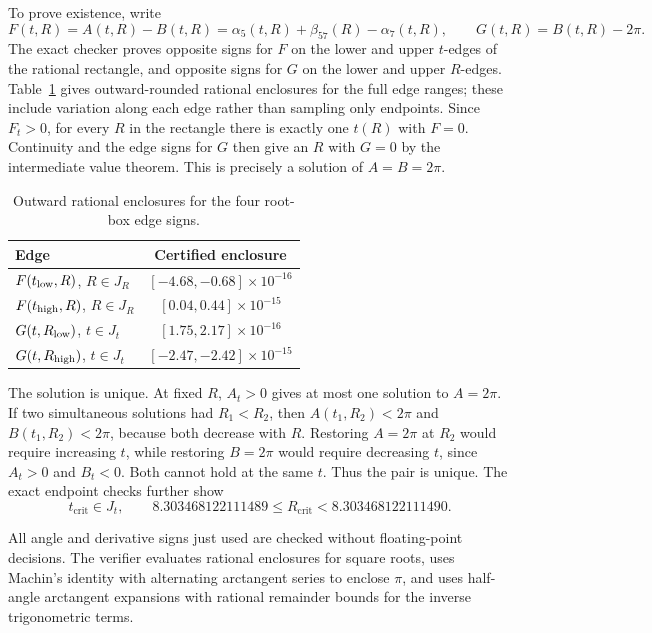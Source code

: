 \documentclass[11pt,a4paper]{article}
\theoremstyle{remark}
\newcommand{\Rcrit}{R_{\mathrm{crit}}}
\begin{document}
To prove existence, write
\[
 F(t,R)=A(t,R)-B(t,R)
       =\alpha_5(t,R)+\beta_{57}(R)-\alpha_7(t,R),
 \qquad
 G(t,R)=B(t,R)-2\pi.
\]
The exact checker proves opposite signs for $F$ on the lower and upper
$t$-edges of the rational rectangle, and opposite signs for $G$ on the lower
and upper $R$-edges.  Table~\ref{tab:root-edge-signs} gives outward-rounded
rational enclosures for the full edge ranges; these include variation along
each edge rather than sampling only endpoints.  Since $F_t>0$,
for every $R$ in the rectangle there is exactly one $t(R)$ with $F=0$.
Continuity and the edge signs for $G$ then give an $R$ with $G=0$ by the
intermediate value theorem.  This is precisely a solution of
$A=B=2\pi$.

\begin{table}[ht]
\centering
\small
\caption{Outward rational enclosures for the four root-box edge signs.}
\label{tab:root-edge-signs}
\begin{tabular}{lc}
\toprule
Edge & Certified enclosure\\
\midrule
$F(t_{\rm low},R)$, $R\in J_R$ & $[-4.68,-0.68]\times10^{-16}$\\
$F(t_{\rm high},R)$, $R\in J_R$ & $[0.04,0.44]\times10^{-15}$\\
$G(t,R_{\rm low})$, $t\in J_t$ & $[1.75,2.17]\times10^{-16}$\\
$G(t,R_{\rm high})$, $t\in J_t$ & $[-2.47,-2.42]\times10^{-15}$\\
\bottomrule
\end{tabular}
\end{table}

The solution is unique.  At fixed $R$, $A_t>0$ gives at most one solution
to $A=2\pi$.  If two simultaneous solutions had $R_1<R_2$, then
$A(t_1,R_2)<2\pi$ and $B(t_1,R_2)<2\pi$, because both decrease with $R$.
Restoring $A=2\pi$ at $R_2$ would require increasing $t$, while restoring
$B=2\pi$ would require decreasing $t$, since $A_t>0$ and $B_t<0$.  Both
cannot hold at the same $t$.  Thus the pair is unique.  The exact endpoint
checks further show
\[
  t_{\mathrm{crit}}\in J_t,\qquad
  8.303468122111489\le \Rcrit<8.303468122111490.
\]

All angle and derivative signs just used are checked without floating-point
decisions.  The verifier evaluates rational enclosures for square roots,
uses Machin's identity with alternating arctangent series to enclose $\pi$,
and uses half-angle arctangent expansions with rational remainder bounds for
the inverse trigonometric terms.
\end{document}

